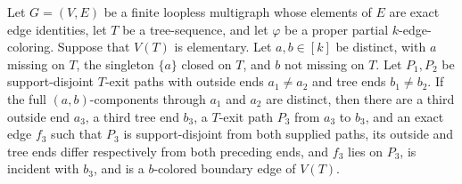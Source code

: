 \begin{helper}
Let $G=(V,E)$ be a finite loopless multigraph whose elements of $E$ are
exact edge identities, let $T$ be a tree-sequence, and let $\varphi$ be a
proper partial $k$-edge-coloring.  Suppose that $V(T)$ is elementary.
Let $a,b\in[k]$ be distinct, with $a$ missing on $T$, the singleton
$\{a\}$ closed on $T$, and $b$ not missing on $T$.  Let $P_1,P_2$ be
support-disjoint $T$-exit paths with outside ends $a_1\ne a_2$ and tree
ends $b_1\ne b_2$.  If the full $(a,b)$-components through $a_1$ and
$a_2$ are distinct, then there are a third outside end $a_3$, a third
tree end $b_3$, a $T$-exit path $P_3$ from $a_3$ to $b_3$, and an exact
edge $f_3$ such that $P_3$ is support-disjoint from both supplied paths,
its outside and tree ends differ respectively from both preceding ends,
and $f_3$ lies on $P_3$, is incident with $b_3$, and is a $b$-colored
boundary edge of $V(T)$.
\end{helper}
